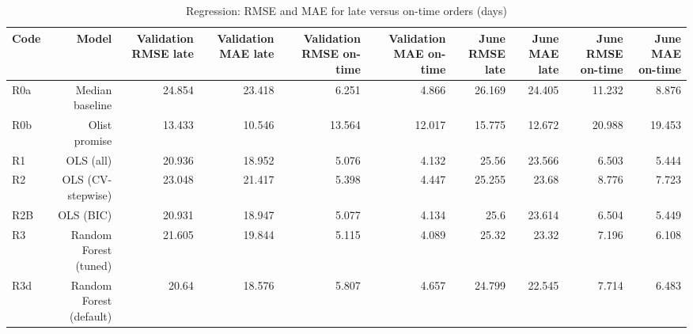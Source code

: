 \begin{table}[htbp]
\centering
\small
\caption{Regression: RMSE and MAE for late versus on-time orders (days)}
\begin{tabular}{lrrrrrrrrr}
\toprule
Code & Model & Validation RMSE late & Validation MAE late & Validation RMSE on-time & Validation MAE on-time & June RMSE late & June MAE late & June RMSE on-time & June MAE on-time \\
\midrule
R0a & Median baseline & 24.854 & 23.418 & 6.251 & 4.866 & 26.169 & 24.405 & 11.232 & 8.876 \\
R0b & Olist promise & 13.433 & 10.546 & 13.564 & 12.017 & 15.775 & 12.672 & 20.988 & 19.453 \\
R1 & OLS (all) & 20.936 & 18.952 & 5.076 & 4.132 & 25.56 & 23.566 & 6.503 & 5.444 \\
R2 & OLS (CV-stepwise) & 23.048 & 21.417 & 5.398 & 4.447 & 25.255 & 23.68 & 8.776 & 7.723 \\
R2B & OLS (BIC) & 20.931 & 18.947 & 5.077 & 4.134 & 25.6 & 23.614 & 6.504 & 5.449 \\
R3 & Random Forest (tuned) & 21.605 & 19.844 & 5.115 & 4.089 & 25.32 & 23.32 & 7.196 & 6.108 \\
R3d & Random Forest (default) & 20.64 & 18.576 & 5.807 & 4.657 & 24.799 & 22.545 & 7.714 & 6.483 \\
\bottomrule
\end{tabular}
\par\smallskip\begin{minipage}{\linewidth}\footnotesize \end{minipage}
\end{table}

